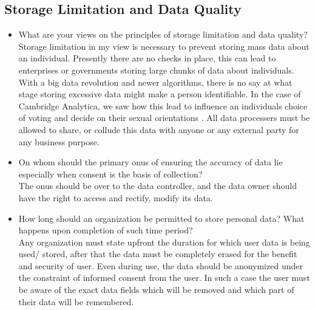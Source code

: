 \subsection{Storage Limitation and Data Quality}
\begin{itemize}
	\item What are your views on the principles of storage limitation and data quality?
	\\
	Storage limitation in my view is necessary to prevent storing mass data about an individual. Presently there are no checks in place, this can lead to enterprises or governments storing large chunks of data about individuals. With a big data revolution and newer algorithms, there is no say at what stage storing excessive data might make a person identifiable. In the case of Cambridge Analytica, we saw how this lead to influence an individuals choice of voting and decide on their sexual orientations \cite{cambana}. All data processers must be allowed to share, or collude this data with anyone or any external party for any business purpose. 
	\item On whom should the primary onus of ensuring the accuracy of data lie especially when consent is the basis of collection?
	\\
	The onus should be over to the data controller, and the data owner should have the right to access and rectify, modify its data.
	\item How long should an organization be permitted to store personal data? What happens upon completion of such time period?
	\\
	Any organization must state upfront the duration for which user data is being used/ stored, after that the data must be completely erased for the benefit and security of user. Even during use, the data should be anonymized under the constraint of informed consent from the user. In such a case the user must be aware of the exact data fields which will be removed and which part of their data will be remembered.
\end{itemize}
